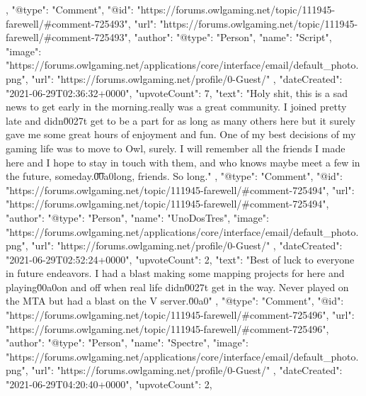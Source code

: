 {{        },
        {
            "@type": "Comment",
            "@id": "https://forums.owlgaming.net/topic/111945-farewell/#comment-725493",
            "url": "https://forums.owlgaming.net/topic/111945-farewell/#comment-725493",
            "author": {
                "@type": "Person",
                "name": "Script",
                "image": "https://forums.owlgaming.net/applications/core/interface/email/default_photo.png",
                "url": "https://forums.owlgaming.net/profile/0-Guest/"
            },
            "dateCreated": "2021-06-29T02:36:32+0000",
            "upvoteCount": 7,
            "text": "Holy shit, this is a sad news to get early in the morning.\n \n\n\n\tOwl really was a great community. I joined pretty late and didn\u0027t get to be a part for as long as many others here but it surely gave me some great hours of enjoyment and fun. One of my best decisions of my gaming life was to move to Owl, surely. I will remember all the friends I made here and I hope to stay in touch with them, and who knows maybe meet a few in the future, someday.\n \n\n\n\t\u00a0\n \n\n\n\tSo long, friends. So long.\n \n"
        },
        {
            "@type": "Comment",
            "@id": "https://forums.owlgaming.net/topic/111945-farewell/#comment-725494",
            "url": "https://forums.owlgaming.net/topic/111945-farewell/#comment-725494",
            "author": {
                "@type": "Person",
                "name": "UnoDosTres",
                "image": "https://forums.owlgaming.net/applications/core/interface/email/default_photo.png",
                "url": "https://forums.owlgaming.net/profile/0-Guest/"
            },
            "dateCreated": "2021-06-29T02:52:24+0000",
            "upvoteCount": 2,
            "text": "Best of luck to everyone in future endeavors. I had a blast making some mapping projects for here and playing\u00a0on and off when real life didn\u0027t get in the way. Never played on the MTA but had a blast on the V server.\u00a0\n \n"
        },
        {
            "@type": "Comment",
            "@id": "https://forums.owlgaming.net/topic/111945-farewell/#comment-725496",
            "url": "https://forums.owlgaming.net/topic/111945-farewell/#comment-725496",
            "author": {
                "@type": "Person",
                "name": "Spectre",
                "image": "https://forums.owlgaming.net/applications/core/interface/email/default_photo.png",
                "url": "https://forums.owlgaming.net/profile/0-Guest/"
            },
            "dateCreated": "2021-06-29T04:20:40+0000",
            "upvoteCount": 2,
}}
